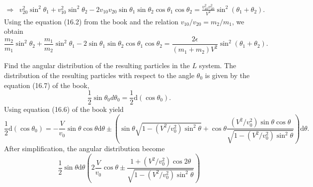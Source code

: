 \begin{problem}
{\begin{align*}
    \Rightarrow& v_{20}^2 \sin^2{\theta_1} + v_{10}^2 \sin^2{\theta_2} - 2 v_{10}v_{20}\sin{\theta_1}\sin{\theta_2}\cos{\theta_1}\cos{\theta_2} = \frac{v_{10}^2v_{20}^2}{V^2}\sin^2{(\theta_1+\theta_2)}.
\end{align*}
Using the equation (16.2) from the book and the relation $v_{10}/v_{20} = m_2/m_1$, we obtain
}
{
\begin{equation*}
    \frac{m_2}{m_1} \sin^2{\theta_2} + \frac{m_1}{m_2} \sin^2{\theta_1} - 2 \sin{\theta_1}\sin{\theta_2}\cos{\theta_1}\cos{\theta_2} = \frac{2\epsilon}{(m_1+m_2)V^2} \sin^2{(\theta_1+\theta_2)}.
\end{equation*}
}
\end{problem}


\begin{problem}
{
    Find the angular distribution of the resulting particles in the $L$ system.
}
{
The distribution of the resulting particles with respect to the angle $\theta_0$ is given by the equation (16.7) of the book, \ie
\begin{equation*}
    \frac{1}{2}\sin{\theta_0}d\theta_0 = \frac{1}{2}\mathrm{d}(\cos{\theta_0}).
\end{equation*}
Using equation (16.6) of the book yield
\begin{equation*}
    \frac{1}{2}\mathrm{d}(\cos{\theta_0}) = -\frac{V}{v_0}\sin{\theta}\cos{\theta}\mathrm{d}\theta \pm \left( \sin{\theta}\sqrt{1-(V^2/v_0^2)\sin^2{\theta}} + \cos{\theta}\frac{(V^2/v_0^2)\sin{\theta}\cos{\theta}}{\sqrt{1-(V^2/v_0^2)\sin^2{\theta}}} \right) \mathrm{d}\theta.
\end{equation*}
After simplification, the angular distribution become
}
{
\begin{equation*}
    \frac{1}{2}\sin{\theta} \mathrm{d}\theta \left( 2\frac{V}{v_0}\cos{\theta} \pm \frac{1+(V^2/v_0^2)\cos{2\theta}}{\sqrt{1-(V^2/v_0^2)\sin^2{\theta}}} \right)
\end{equation*}
}
\end{problem}


